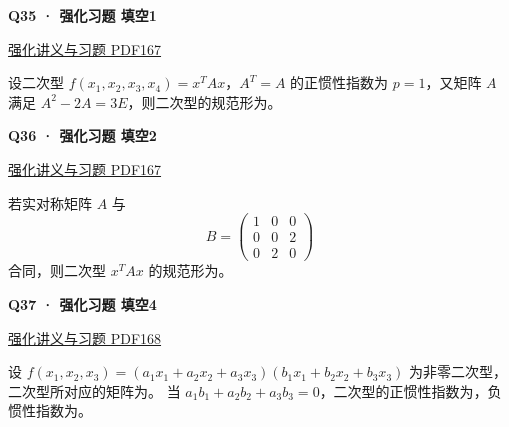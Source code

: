 \documentclass[UTF8,fontset=fandol,11pt,a4paper]{ctexart}
\newcommand{\source}[1]{{\footnotesize\color{Muted}#1\par}}
\newcommand{\qtitle}[2]{\par\needspace{5\baselineskip}\hypertarget{#1}{}\label{#1}\textbf{#2}\par}
\begin{document}
\begin{minipage}{\linewidth}
\qtitle{R-FILL-01}{Q35 · 强化习题 填空1}
\source{\href{file:///Users/skyintelligence/Desktop/\%E5\%BE\%97\%E8\%AF\%BB\%E4\%B8\%AA\%E7\%A0\%94-\%E5\%8C\%97\%E5\%A4\%A7\%E8\%BD\%AF\%E5\%BE\%AE/\%E6\%95\%B0\%E5\%AD\%A6\%20150/Kira\%C2\%B727\%E7\%BA\%BF\%E6\%80\%A7\%E4\%BB\%A3\%E6\%95\%B0\%E5\%BC\%BA\%E5\%8C\%96\%E8\%AE\%B2\%E4\%B9\%89\%2B\%E4\%B9\%A0\%E9\%A2\%98.pdf\#page=167}{强化讲义与习题 PDF167}}
设二次型 $f(x_1,x_2,x_3,x_4)=x^TAx$，$A^T=A$ 的正惯性指数为 $p=1$，又矩阵 $A$ 满足 $A^2-2A=3E$，则二次型的规范形为\underline{\hspace{4cm}}。
\end{minipage}\par\vspace{7mm}
\begin{minipage}{\linewidth}
\qtitle{R-FILL-02}{Q36 · 强化习题 填空2}
\source{\href{file:///Users/skyintelligence/Desktop/\%E5\%BE\%97\%E8\%AF\%BB\%E4\%B8\%AA\%E7\%A0\%94-\%E5\%8C\%97\%E5\%A4\%A7\%E8\%BD\%AF\%E5\%BE\%AE/\%E6\%95\%B0\%E5\%AD\%A6\%20150/Kira\%C2\%B727\%E7\%BA\%BF\%E6\%80\%A7\%E4\%BB\%A3\%E6\%95\%B0\%E5\%BC\%BA\%E5\%8C\%96\%E8\%AE\%B2\%E4\%B9\%89\%2B\%E4\%B9\%A0\%E9\%A2\%98.pdf\#page=167}{强化讲义与习题 PDF167}}
若实对称矩阵 $A$ 与
\[B=\begin{pmatrix}1&0&0\\0&0&2\\0&2&0\end{pmatrix}\]
合同，则二次型 $x^TAx$ 的规范形为\underline{\hspace{4cm}}。
\end{minipage}\par\vspace{7mm}
\begin{minipage}{\linewidth}
\qtitle{R-FILL-04}{Q37 · 强化习题 填空4}
\source{\href{file:///Users/skyintelligence/Desktop/\%E5\%BE\%97\%E8\%AF\%BB\%E4\%B8\%AA\%E7\%A0\%94-\%E5\%8C\%97\%E5\%A4\%A7\%E8\%BD\%AF\%E5\%BE\%AE/\%E6\%95\%B0\%E5\%AD\%A6\%20150/Kira\%C2\%B727\%E7\%BA\%BF\%E6\%80\%A7\%E4\%BB\%A3\%E6\%95\%B0\%E5\%BC\%BA\%E5\%8C\%96\%E8\%AE\%B2\%E4\%B9\%89\%2B\%E4\%B9\%A0\%E9\%A2\%98.pdf\#page=168}{强化讲义与习题 PDF168}}
设 $f(x_1,x_2,x_3)=(a_1x_1+a_2x_2+a_3x_3)(b_1x_1+b_2x_2+b_3x_3)$ 为非零二次型，二次型所对应的矩阵为\underline{\hspace{4cm}}。
当 $a_1b_1+a_2b_2+a_3b_3=0$，二次型的正惯性指数为\underline{\hspace{1.5cm}}，负惯性指数为\underline{\hspace{1.5cm}}。
\end{minipage}\par\vspace{7mm}
\end{document}
